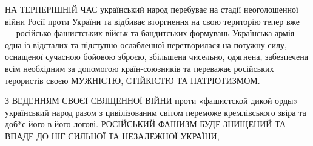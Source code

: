 НА ТЕРПЕРІШНІЙ ЧАС український народ перебуває на стадії неоголошенної
війни Росії проти України та відбиває вторгнення на свою територію тепер
вже — російсько-фашистських військ та бандитських формувань Українська
армія одна із відсталих та підступно ослабленної перетворилася на потужну
силу, оснащеної сучасною бойовою зброєю, збільшена чисельно, одягнена,
забезпечена всім необхідним за допомогою країн-союзників та переважає
російських терористів своєю МУЖНІСТЮ, СТІЙКІСТЮ ТА ПАТРІОТИЗМОМ. 

З ВЕДЕННЯМ СВОЄЇ СВЯЩЕННОЇ ВІЙНИ проти «фашистской дикой орды»
український народ разом з цивілізованим світом переможе кремлівського звіра
та доб*є його в його логові. РОСІЙСЬКИЙ ФАШИЗМ БУДЕ ЗНИЩЕНИЙ ТА ВПАДЕ ДО НІГ
СИЛЬНОЇ ТА НЕЗАЛЕЖНОЇ УКРАЇНИ,

